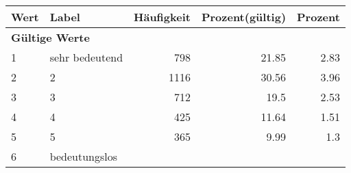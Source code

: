      \begin{longtable}{lXrrr}
     \toprule
     \textbf{Wert} & \textbf{Label} & \textbf{Häufigkeit} & \textbf{Prozent(gültig)} & \textbf{Prozent} \\
     \endhead
     \midrule
     \multicolumn{5}{l}{\textbf{Gültige Werte}}\\

     1 &
     \multicolumn{1}{X}{ sehr bedeutend   } &


       \num{798} &
       \num[round-mode=places,round-precision=2]{21,85} &
         \num[round-mode=places,round-precision=2]{2,83} \\

     2 &
     \multicolumn{1}{X}{ 2   } &


       \num{1116} &
       \num[round-mode=places,round-precision=2]{30,56} &
         \num[round-mode=places,round-precision=2]{3,96} \\

     3 &
     \multicolumn{1}{X}{ 3   } &


       \num{712} &
       \num[round-mode=places,round-precision=2]{19,5} &
         \num[round-mode=places,round-precision=2]{2,53} \\

     4 &
     \multicolumn{1}{X}{ 4   } &


       \num{425} &
       \num[round-mode=places,round-precision=2]{11,64} &
         \num[round-mode=places,round-precision=2]{1,51} \\

     5 &
     \multicolumn{1}{X}{ 5   } &


       \num{365} &
       \num[round-mode=places,round-precision=2]{9,99} &
         \num[round-mode=places,round-precision=2]{1,3} \\

     6 &
     \multicolumn{1}{X}{ bedeutungslos   } &



\end{longtable}
